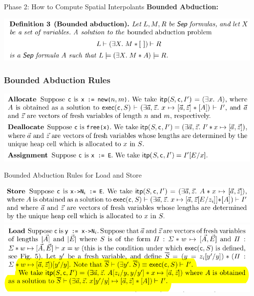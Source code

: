 \documentclass[aspectratio=1610, 13pt]{beamer}
\begin{document}
\begin{frame}{Phase 2: How to Compute Spatial Interpolants}
\textbf{Bounded Abduction:}
\begin{center}

\includegraphics[scale=0.4]{20.png}
\end{center}
\end{frame}

\begin{frame}\frametitle{Bounded Abduction Rules}
\begin{center}
\includegraphics[scale=0.4]{21.png}
\end{center}
\end{frame}

\begin{frame}{Bounded Abduction Rules for Load and Store}
\begin{center}
\includegraphics[scale=0.4]{22.png}
\includegraphics[scale=0.4]{23.png}
\end{center}
\end{frame}
\end{document}
